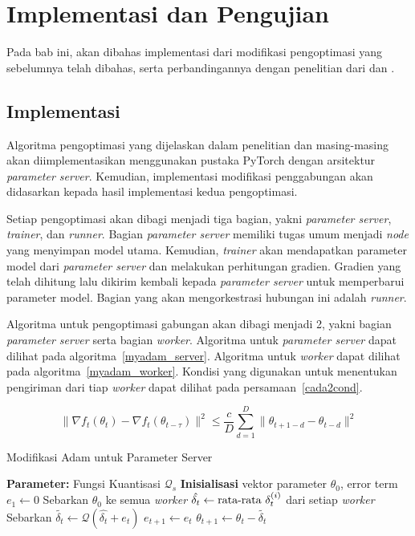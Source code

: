 \chapter{Implementasi dan Pengujian}

Pada bab ini, akan dibahas implementasi dari modifikasi pengoptimasi yang sebelumnya telah dibahas, serta perbandingannya dengan penelitian dari \textcite{Chen2022Efficient} dan \textcite{Chen2021CADA}.

\section{Implementasi}
Algoritma pengoptimasi yang dijelaskan dalam penelitian \textcite{Chen2022Efficient} dan \textcite{Chen2021CADA} masing-masing akan diimplementasikan menggunakan pustaka PyTorch dengan arsitektur \emph{parameter server}. Kemudian, implementasi modifikasi penggabungan akan didasarkan kepada hasil implementasi kedua pengoptimasi.

Setiap pengoptimasi akan dibagi menjadi tiga bagian, yakni \emph{parameter server}, \emph{trainer}, dan \emph{runner}. Bagian \emph{parameter server} memiliki tugas umum menjadi \emph{node} yang menyimpan model utama. Kemudian, \emph{trainer} akan mendapatkan parameter model dari \emph{parameter server} dan melakukan perhitungan gradien. Gradien yang telah dihitung lalu dikirim kembali kepada \emph{parameter server} untuk memperbarui parameter model. Bagian yang akan mengorkestrasi hubungan ini adalah \emph{runner}.

Algoritma untuk pengoptimasi gabungan akan dibagi menjadi 2, yakni bagian \textit{parameter server} serta bagian \textit{worker}. Algoritma untuk \textit{parameter server} dapat dilihat pada algoritma~\ref{myadam_server}. Algoritma untuk \textit{worker} dapat dilihat pada algoritma~\ref{myadam_worker}. Kondisi yang digunakan untuk menentukan pengiriman dari tiap \textit{worker} dapat dilihat pada persamaan~\ref{cada2cond}.

\begin{equation}
  \label{cada2cond}
  \|\nabla f_t(\theta_t) - \nabla f_t(\theta_{t-\tau})\|^2 \leq \frac{c}{D} \sum_{d=1}^{D} \|\theta_{t+1-d} - \theta_{t-d}\|^2
\end{equation}

\begin{algorithm}[ht]
  \caption{Modifikasi Adam untuk Parameter Server}\label{myadam_server}
  \begin{algorithmic}[1]
    \State \textbf{Parameter:} Fungsi Kuantisasi $\mathcal{Q}_s$
    \State \textbf{Inisialisasi} vektor parameter $\theta_0$, error term $e_1 \gets 0$
    \State Sebarkan $\theta_0$ ke semua \textit{worker}
    \State $\hat{\delta_t} \gets \textnormal{rata-rata } \delta_t^{(i)}$ dari setiap \textit{worker}
    \State Sebarkan $\tilde{\delta_t} \gets \mathcal{Q}(\hat{\delta_t} + e_t)$
    \State $e_{t+1} \gets e_{t}$
    \State $\theta_{t+1} \gets \theta_t - \tilde{\delta_t}$
    \EndFor
  \end{algorithmic}
\end{algorithm}

